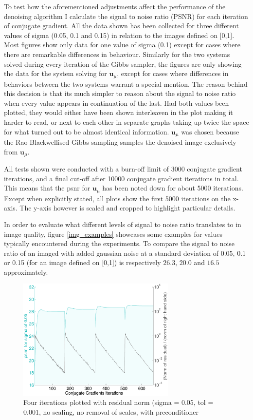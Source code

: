 \documentclass{article}
\begin{document}
To test how the aforementioned adjustments affect the performance of the 
denoising algorithm I calculate the signal to noise ratio (PSNR) for 
each iteration of conjugate gradient. All the data shown has been 
collected for three different values of sigma (0.05, 0.1 and 0.15) in 
relation to the images defined on [0,1]. Most figures show only data for 
one value of sigma (0.1) except for cases where there are remarkable 
differences in behaviour.  Similarly for the two systems solved during 
every iteration of the Gibbs sampler, the figures are only showing the 
data for the system solving for $\textbf{u}_{\mu}$, except for cases 
where differences in behaviors between the two systems warrant a special 
mention. The reason behind this decision is that its much simpler to 
reason about the signal to noise ratio when every value appears in 
continuation of the last. Had both values been plotted, they would 
either have been shown interleaven in the plot making it harder to read, 
or next to each other in separate graphs taking up twice the space for 
what turned out to be almost identical information. $\textbf{u}_{\mu}$ 
was chosen because the Rao-Blackwellised Gibbs sampling samples the 
denoised image exclusively from $\textbf{u}_{\mu}$.  

All tests shown were conducted with a burn-off limit of 3000 conjugate 
gradient iterations, and a final cut-off after 10000 conjugate gradient 
iterations in total.  This means that the psnr for $\textbf{u}_{\mu}$ 
has been noted down for about 5000 iterations.  Except when explicitly 
stated, all plots show the first 5000 iterations on the x-axis. The 
y-axis however is scaled and cropped to highlight particular details.

In order to evaluate what different levels of signal to noise ratio 
translates to in image quality, figure \ref{img_examples} showcases some 
examples for values typically encountered during the experiments. To 
compare the signal to noise ratio of an imaged with added gaussian noise 
at a standard deviation of 0.05, 0.1 or 0.15  (for an image defined on 
[0,1]) is respectively $26.3, \, 20.0$ and $16.5$ approximately. 

\begin{figure}[h!]
	\centering
	\includegraphics[width=0.7\textwidth]{img/normal_zoom}
	\caption{Four iterations plotted with residual norm (sigma = 0.05, 
tol = 0.001, no scaling, no removal of scales, with preconditioner}
	\label{fig:res_error}
\end{figure}
\end{document}
